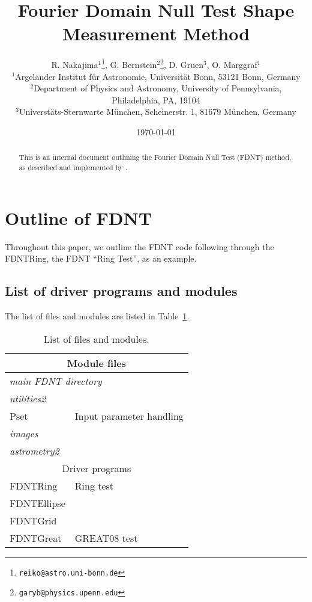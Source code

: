 \documentclass[useAMS,usenatbib,usegraphicx]{mn2e}
\title[FDNT]{Fourier Domain Null Test Shape Measurement Method}
\author[Nakajima et al.]{R. Nakajima$^1$\thanks{\texttt{reiko@astro.uni-bonn.de}}, 
G. Bernstein$^2$\thanks{\texttt{garyb@physics.upenn.edu}}, 
D. Gruen$^3$, O. Marggraf$^1$ \\ 
  $^1$Argelander Institut f\"{u}r Astronomie, Universit\"{a}t Bonn, 53121 Bonn, Germany \\
  $^2$Department of Physics and Astronomy, University of Pennsylvania, Philadelphia, PA, 19104 \\
  $^3$Universt\"{a}ts-Sternwarte M\"{u}nchen, Scheinerstr. 1, 81679 M\"{u}nchen, Germany
}
\begin{document}
\date{\today}

\maketitle

\begin{abstract}
This is an internal document outlining the Fourier Domain Null Test (FDNT) method,
as described and implemented by \citet{bernstein:2010}.
\end{abstract}

\section{Outline of FDNT}

Throughout this paper, we outline the FDNT code following through the FDNTRing, 
the FDNT ``Ring Test'', as an example.

\subsection{List of driver programs and modules}

The list of files and modules are listed in Table~\ref{tab:module_list}.

\begin{table}
\begin{tabular}{l l}
\hline \hline
\multicolumn{2}{c}{Module files} \\
\hline
\multicolumn{2}{l}{\em main FDNT directory} \\
\hline
\multicolumn{2}{l}{\em utilities2} \\
Pset & Input parameter handling \\
\hline
\multicolumn{2}{l}{\em images} \\
\hline
\multicolumn{2}{l}{\em astrometry2} \\
\hline \hline 
\multicolumn{2}{c}{Driver programs} \\
\hline
FDNTRing & Ring test \citep{nakajima/bernstein:2007} \\
FDNTEllipse & \\
FDNTGrid & \\
FDNTGreat & GREAT08 test \citep{bridle/etal:2009} \\
\hline \hline
\end{tabular}
\caption{List of files and modules.}
\label{tab:module_list}
\end{table}
\end{document}
